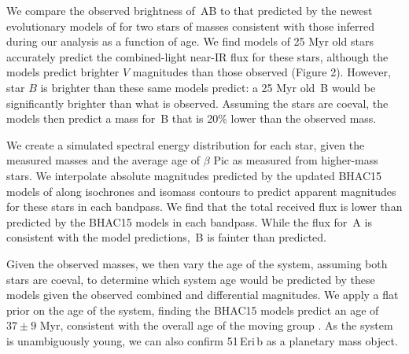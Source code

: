 We compare the observed brightness of \thisstarsix\,AB to that predicted by the newest evolutionary models
of \citet{Baraffe15} for two stars of masses consistent with those inferred during our analysis
as a function of age. 
We find models of 25 Myr old stars accurately predict the combined-light near-IR flux for these
stars, although the models predict brighter $V$ magnitudes than those observed (Figure 2).
However, star $B$ is brighter than these same models predict: a 25 Myr old \thisstarsix\,B would be 
significantly brighter than what is observed. 
Assuming the stars are coeval, the models then predict a mass for \thisstarsix\,B that is 20\% lower 
than the observed mass. 

We create a simulated spectral energy distribution for each star, given the measured masses and the average age of 
$\beta$ Pic as measured from higher-mass stars. 
We interpolate absolute magnitudes predicted by the updated BHAC15 models of \citet{Baraffe15} along 
isochrones and isomass contours to predict apparent 
magnitudes for these stars in each bandpass.
We find that the total received flux is lower than
predicted by the BHAC15 models in each bandpass. While the flux for \thisstarsix\,A is consistent with 
the model predictions, \thisstarsix\,B is fainter than predicted.

Given the observed masses, we then vary the age of the system, assuming both stars are coeval, 
to determine which system age would be predicted by
these models given the observed combined and differential magnitudes.
We apply a flat prior on the age of the system, finding the BHAC15 models predict an age of $37 \pm 9$ Myr, consistent with the overall
age of the moving group \citep[$24 \pm 3$ Myr,][]{Bell15}.
As the system is unambiguously young, we can also confirm 51\,Eri\,b as 
a planetary mass object.


